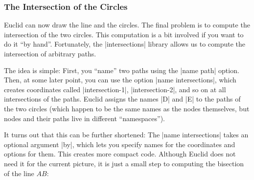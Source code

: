 \subsubsection{The Intersection of the Circles}

Euclid can now draw the line and the circles. The final problem is to compute
the intersection of the two circles. This computation is a bit involved if you
want to do it ``by hand''. Fortunately, the |intersections| library allows us
to compute the intersection of arbitrary paths.

The idea is simple: First, you ``name'' two paths using the |name path| option.
Then, at some later point, you can use the option |name intersections|, which
creates coordinates called |intersection-1|, |intersection-2|, and so on at all
intersections of the paths. Euclid assigns the names |D| and |E| to the paths
of the two circles (which happen to be the same names as the nodes themselves,
but nodes and their paths live in different ``namespaces'').
%
\begin{codeexample}[preamble={\usetikzlibrary{intersections,through}}]
\end{codeexample}

It turns out that this can be further shortened: The |name intersections| takes
an optional argument |by|, which lets you specify names for the coordinates and
options for them. This creates more compact code. Although Euclid does not need
it for the current picture, it is just a small step to computing the bisection
of the line $AB$:
%
\begin{codeexample}[preamble={\usetikzlibrary{intersections,through}}]
\end{codeexample}


